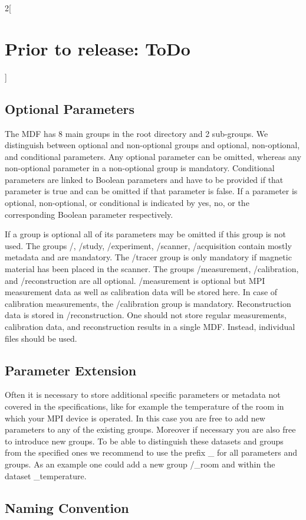 \documentclass[landscape,a4paper]{article} %
\newcommand{\inlvar}[1]{{\ttfamily#1}}
\begin{document}
\begin{multicols}{2}[\section{Prior to release: ToDo}]
\subsection{Optional Parameters}

The MDF has 8 main groups in the root directory and 2 sub-groups. We distinguish between optional and non-optional groups and optional, non-optional, and conditional parameters. Any optional parameter can be omitted, whereas any non-optional parameter in a non-optional group is mandatory. Conditional parameters are linked to Boolean parameters and have to be provided if that parameter is true and can be omitted if that parameter is false. If a parameter is optional, non-optional, or conditional is indicated by yes, no, or the corresponding Boolean parameter respectively.

If a group is optional all of its parameters may be omitted if this group is not used. The groups \inlvar{/}, \inlvar{/study}, \inlvar{/experiment}, \inlvar{/scanner}, \inlvar{/acquisition} contain mostly metadata and are mandatory. The \inlvar{/tracer} group is only mandatory if magnetic material has been placed in the scanner. The groups \inlvar{/measurement}, \inlvar{/calibration}, and \inlvar{/reconstruction} are all optional. \inlvar{/measurement} is optional but MPI measurement data as well as calibration data will be stored here. In case of calibration measurements, the \inlvar{/calibration} group is mandatory. Reconstruction data is stored in \inlvar{/reconstruction}. One should not store regular measurements, calibration data, and reconstruction results in a single MDF. Instead, individual files should be used.

\subsection{Parameter Extension}

Often it is necessary to store additional specific parameters or metadata not covered in the specifications, like for example the temperature of the room in which your MPI device is operated. In this case you are free to add new parameters to any of the existing groups. Moreover if necessary you are also free to introduce new groups. To be able to distinguish these datasets and groups from the specified ones we recommend to use the prefix \inlvar{\_} for all parameters and groups. As an example one could add a new group \inlvar{/\_room} and within the dataset \inlvar{\_temperature}.

\subsection{Naming Convention}


\end{multicols}
\end{document}
